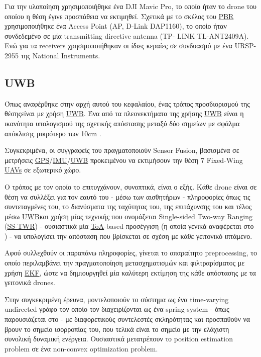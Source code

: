 Για την υλοποίηση χρησιμοποιήθηκε ένα DJI Mavic Pro, το οποίο ήταν το drone του οποίου η θέση έγινε προσπάθεια να εκτιμηθεί.
Σχετικά με το σκέλος του \hyperref[abbr:PBR]{PBR} χρησιμοποιήθηκε ένα Access Point (AP, D-Link DAP1160), το οποίο ήταν συ\-νδε\-δε\-μέ\-νο σε μία transmitting directive antenna (TP-
LINK TL-ANT2409A). Ενώ για τα receivers χρησιμοποιήθηκαν οι ίδιες κεραίες σε συνδυασμό με ένα URSP-2955 της National
Instruments.


\subsection{UWB}
Όπως αναφέρθηκε στην αρχή αυτού του κεφαλαίου, ένας τρόπος προσδιορισμού της θέσης\udot είναι με χρήση \hyperref[abbr:UWB]{UWB}.
Ένα από τα πλεονεκτήματα της χρήσης \hyperref[abbr:UWB]{UWB} είναι η ικανότητα υπολογισμού της σχετικής απόστασης μεταξύ δύο
σημείων με σφάλμα απόκλισης μικρότερο των 10cm \cite{uwb-accuracy}.

Συγκεκριμένα, οι συγγραφείς του \cite{uwb-imu-gps1} πραγματοποιούν Sensor Fusion, βασισμένα σε μετρήσεις 
\hyperref[abbr:GPS]{GPS}/\hyperref[abbr:IMU]{IMU}/\hyperref[abbr:UWB]{UWB} προκειμένου να εκτιμήσουν την θέση 
7 Fixed-Wing \hyperref[abbr:UAV]{UAVs} σε εξωτερικό χώρο.

Ο τρόπος με τον οποίο το επιτυγχάνουν, συνοπτικά, είναι ο εξής. Κάθε drone είναι σε θέση να συλλέξει για τον εαυτό του 
- μέσω των αισθητήρων - πληροφορίες όπως τις συντεταγμένες του, το διανύσματα της ταχύτητας του, της
επιτάχυνσης του και τέλος μέσω \hyperref[abbr:UWB]{UWB}\udot και χρήση μίας τεχνικής που ονομάζεται Single-sided Two-way Ranging 
(\hyperref[abbr:SS-TWR]{SS-TWR}) - ουσιαστικά μία \hyperref[abbr:ToA]{ToA}-based προσέγγιση (η οποία γενικά αναφέρεται 
στο ) - να υπολογίσει την απόσταση που βρίσκεται σε σχέση με κάθε γειτονικό ιπτάμενο.

Αφού συλλεχθούν οι παραπάνω πληροφορίες, γίνεται το απαραίτητο preprocessing, το οποίο περιλαμβάνει την πραγματοποίηση μετασχηματισμών
και φιλτραρίσματος με χρήση \hyperref[abbr:EKF]{EKF}, ώστε να δημιουργηθεί μία καλύτερη εκτίμηση της κάθε απόστασης με τα γειτονικά drones.

Στην συγκεκριμένη έρευνα, μοντελοποιούν το σύστημα ως ένα time-varying undirected γράφο τον οποίο τον διαχειρίζονται ως ένα spring system - όπως παρουσιάζεται στο 
 - με διαφορετικούς συντελεστές σκληρότητας και προσπαθούν να βρουν το σημείο ισορροπίας του, που τελικά είναι το σημείο 
με την ελάχιστη συνολική δυναμική ενέργεια. Ουσιαστικά μετατρέπουν το position estimation problem σε ένα non-convex optimization problem.


